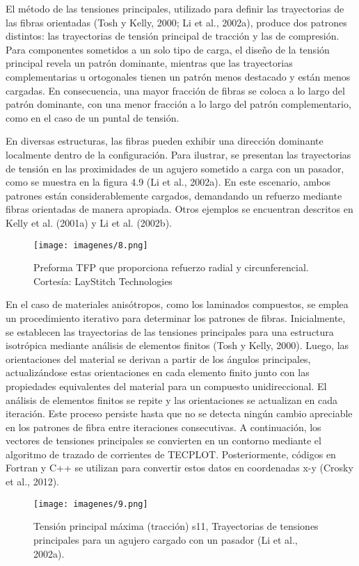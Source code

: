 \begin{enumerate}[label=\arabic*.]
El método de las tensiones principales, utilizado para definir las trayectorias de las fibras orientadas (Tosh y Kelly, 2000; Li et al., 2002a), produce dos patrones distintos: las trayectorias de tensión principal de tracción y las de compresión. Para componentes sometidos a un solo tipo de carga, el diseño de la tensión principal revela un patrón dominante, mientras que las trayectorias complementarias u ortogonales tienen un patrón menos destacado y están menos cargadas. En consecuencia, una mayor fracción de fibras se coloca a lo largo del patrón dominante, con una menor fracción a lo largo del patrón complementario, como en el caso de un puntal de tensión.


En diversas estructuras, las fibras pueden exhibir una dirección dominante localmente dentro de la configuración. Para ilustrar, se presentan las trayectorias de tensión en las proximidades de un agujero sometido a carga con un pasador, como se muestra en la figura 4.9 (Li et al., 2002a). En este escenario, ambos patrones están considerablemente cargados, demandando un refuerzo mediante fibras orientadas de manera apropiada. Otros ejemplos se encuentran descritos en Kelly et al. (2001a) y Li et al. (2002b).
\begin{figure}[h]
    \centering
    \texttt{[image: imagenes/8.png]}
    \caption{ Preforma TFP que proporciona refuerzo radial y circunferencial.
Cortesía: LayStitch Technologies}
    \label{fig:enter-label}
\end{figure}

En el caso de materiales anisótropos, como los laminados compuestos, se emplea un procedimiento iterativo para determinar los patrones de fibras. Inicialmente, se establecen las trayectorias de las tensiones principales para una estructura isotrópica mediante análisis de elementos finitos (Tosh y Kelly, 2000). Luego, las orientaciones del material se derivan a partir de los ángulos principales, actualizándose estas orientaciones en cada elemento finito junto con las propiedades equivalentes del material para un compuesto unidireccional. El análisis de elementos finitos se repite y las orientaciones se actualizan en cada iteración. Este proceso persiste hasta que no se detecta ningún cambio apreciable en los patrones de fibra entre iteraciones consecutivas. A continuación, los vectores de tensiones principales se convierten en un contorno mediante el algoritmo de trazado de corrientes de TECPLOT. Posteriormente, códigos en Fortran y C++ se utilizan para convertir estos datos en coordenadas x-y (Crosky et al., 2012).
\begin{figure}[h]
    \centering
    \texttt{[image: imagenes/9.png]}
    \caption{Tensión principal máxima (tracción) s11, Trayectorias de tensiones principales para un agujero cargado con un pasador (Li et al., 2002a).}
    \label{fig:enter-label}
\end{figure}


\end{enumerate}
